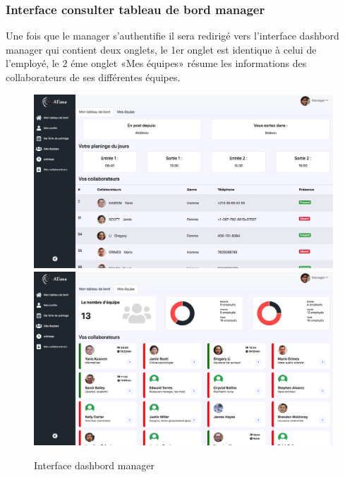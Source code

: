         \clearpage
            \subsubsection*{Interface consulter tableau de bord manager}
            Une fois que le manager s'authentifie il sera redirigé vers l’interface dashbord manager qui contient deux onglets, le 1er onglet est identique à celui de l’employé, le 2 éme onglet «Mes équipes» résume les informations des collaborateurs de ses différentes équipes. 
            
                \begin{figure}[h!]
                             \centering
                        \includegraphics[scale=0.326 ]{images/interface/dashbord_manager1.png}
                        \includegraphics[scale=0.326 ]{images/interface/dashbord_manager.png}
                             \caption{Interface dashbord manager}
                             \label{fig96}
                \end{figure}
                
